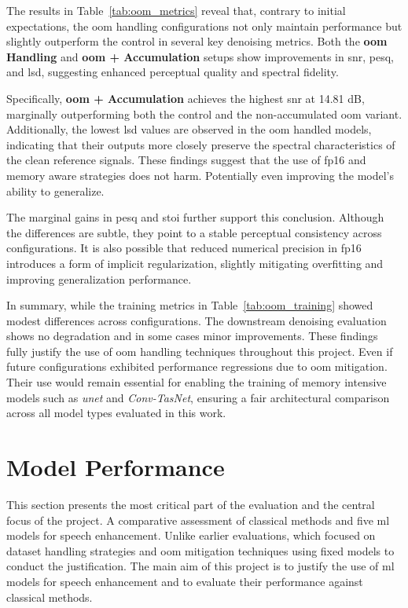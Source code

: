 The results in Table~\ref{tab:oom_metrics} reveal that, contrary to initial expectations, the \gls{oom} handling configurations not only maintain performance but slightly outperform the control in several key denoising metrics. Both the \textbf{\gls{oom} Handling} and \textbf{\gls{oom} + Accumulation} setups show improvements in \gls{snr}, \gls{pesq}, and \gls{lsd}, suggesting enhanced perceptual quality and spectral fidelity.

Specifically, \textbf{\gls{oom} + Accumulation} achieves the highest \gls{snr} at 14.81 dB, marginally outperforming both the control and the non-accumulated \gls{oom} variant. Additionally, the lowest \gls{lsd} values are observed in the \gls{oom} handled models, indicating that their outputs more closely preserve the spectral characteristics of the clean reference signals. These findings suggest that the use of \gls{fp16} and memory aware strategies does not harm. Potentially even improving the model's ability to generalize. 

The marginal gains in \gls{pesq} and \gls{stoi} further support this conclusion. Although the differences are subtle, they point to a stable perceptual consistency across configurations. It is also possible that reduced numerical precision in \gls{fp16} introduces a form of implicit regularization, slightly mitigating overfitting and improving generalization performance.

In summary, while the training metrics in Table~\ref{tab:oom_training} showed modest differences across configurations. The downstream denoising evaluation shows no degradation and in some cases minor improvements. These findings fully justify the use of \gls{oom} handling techniques throughout this project. Even if future configurations exhibited performance regressions due to \gls{oom} mitigation. Their use would remain essential for enabling the training of memory intensive models such as \textit{\gls{unet}} and \textit{Conv-TasNet}, ensuring a fair architectural comparison across all model types evaluated in this work.

\section{Model Performance}
\label{sec:model_performance}

This section presents the most critical part of the evaluation and the central focus of the project. A comparative assessment of classical methods and five \gls{ml} models for speech enhancement. Unlike earlier evaluations, which focused on dataset handling strategies and \gls{oom} mitigation techniques using fixed models to conduct the justification. The main aim of this project is to justify the use of \gls{ml} models for speech enhancement and to evaluate their performance against classical methods.

